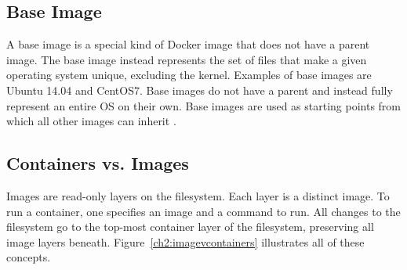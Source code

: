\subsection{Base Image}
A base image is a special kind of Docker image that does not have a parent image. The base image instead represents the set of files that make a given operating system unique, excluding the kernel. Examples of base images are Ubuntu 14.04 and CentOS7. Base images do not have a parent and instead fully represent an entire OS on their own. Base images are used as starting points from which all other images can inherit \cite{baseimage}. 

\subsection{Containers vs. Images}
Images are read-only layers on the filesystem. Each layer is a distinct image. To run a container, one specifies an image and a command to run. All changes to the filesystem go to the top-most container layer of the filesystem, preserving all image layers beneath. Figure~\ref{ch2:imagevcontainers} illustrates all of these concepts.


